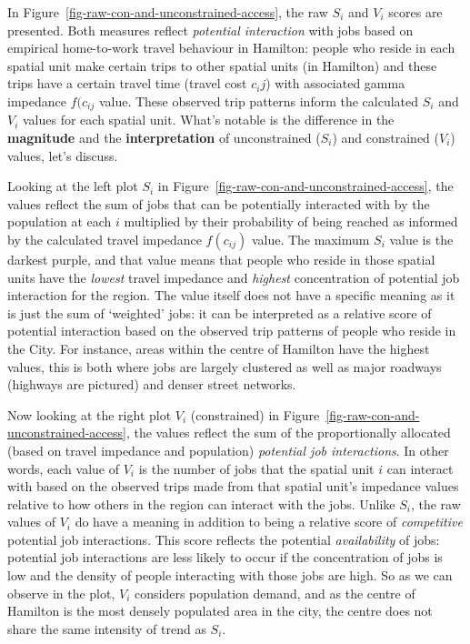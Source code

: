 \documentclass[12pt, oneside]{report}
\begin{document}
In Figure~\ref{fig-raw-con-and-unconstrained-access}, the raw \(S_i\)
and \(V_i\) scores are presented. Both measures reflect \emph{potential
interaction} with jobs based on empirical home-to-work travel behaviour
in Hamilton: people who reside in each spatial unit make certain trips
to other spatial units (in Hamilton) and these trips have a certain
travel time (travel cost \(c_ij\)) with associated gamma impedance
\(f(c_{ij}\) value. These observed trip patterns inform the calculated
\(S_i\) and \(V_i\) values for each spatial unit. What's notable is the
difference in the \textbf{magnitude} and the \textbf{interpretation} of
unconstrained (\(S_i\)) and constrained (\(V_i\)) values, let's discuss.

Looking at the left plot \(S_i\) in
Figure~\ref{fig-raw-con-and-unconstrained-access}, the values reflect
the sum of jobs that can be potentially interacted with by the
population at each \(i\) multiplied by their probability of being
reached as informed by the calculated travel impedance \(f(c_{ij})\)
value. The maximum \(S_i\) value is the darkest purple, and that value
means that people who reside in those spatial units have the
\emph{lowest} travel impedance and \emph{highest} concentration of
potential job interaction for the region. The value itself does not have
a specific meaning as it is just the sum of `weighted' jobs: it can be
interpreted as a relative score of potential interaction based on the
observed trip patterns of people who reside in the City. For instance,
areas within the centre of Hamilton have the highest values, this is
both where jobs are largely clustered as well as major roadways
(highways are pictured) and denser street networks.

Now looking at the right plot \(V_i\) (constrained) in
Figure~\ref{fig-raw-con-and-unconstrained-access}, the values reflect
the sum of the proportionally allocated (based on travel impedance and
population) \emph{potential job interactions}. In other words, each
value of \(V_i\) is the number of jobs that the spatial unit \(i\) can
interact with based on the observed trips made from that spatial unit's
impedance values relative to how others in the region can interact with
the jobs. Unlike \(S_i\), the raw values of \(V_i\) do have a meaning in
addition to being a relative score of \emph{competitive} potential job
interactions. This score reflects the potential \emph{availability} of
jobs: potential job interactions are less likely to occur if the
concentration of jobs is low and the density of people interacting with
those jobs are high. So as we can observe in the plot, \(V_i\) considers
population demand, and as the centre of Hamilton is the most densely
populated area in the city, the centre does not share the same intensity
of trend as \(S_i\).
\end{document}
